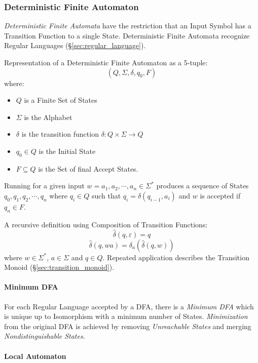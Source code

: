 \subsubsection{Deterministic Finite Automaton}\label{sec:dfa}

\emph{Deterministic Finite Automata} have the restriction that an
Input Symbol has a Transition Function to a single State.
Deterministic Finite Automata recognize Regular Languages
(\S\ref{sec:regular_language}).

Representation of a Deterministic Finite Automaton as a 5-tuple:
\[
  (Q,\Sigma,\delta,q_0,F)
\]
where:
\begin{itemize}
  \item $Q$ is a Finite Set of States
  \item $\Sigma$ is the Alphabet
  \item $\delta$ is the transition function $\delta: Q \times
    \Sigma \rightarrow Q$
  \item $q_0 \in Q$ is the Initial State
  \item $F \subseteq Q$ is the Set of final Accept States.
\end{itemize}

Running for a given input $w = a_1,a_2, \cdots , a_n \in \Sigma^*$
produces a sequence of States $q_0,q_1,q_2,\cdots , q_n$ where $q_i
\in Q$ such that $q_i = \delta (q_{i-1},a_i)$ and $w$ is accepted if
$q_n \in F$.

A recursive definition using Composition of Transition Functions:
\[
  \widehat{\delta}(q,\varepsilon) = q
\]\[
  \widehat{\delta}(q,wa) = \delta_a(\widehat{\delta}(q,w))
\]
where $w \in \Sigma^*$, $a \in \Sigma$ and $q \in Q$. Repeated
application describes the Transition Monoid
(\S\ref{sec:transition_monoid}).



\paragraph{Minimum DFA}\label{sec:minimum_dfa}\hfill

For each Regular Language accepted by a DFA, there is a \emph{Minimum
  DFA} which is unique up to Isomorphism with a minimum number of
States. \emph{Minimization} from the original DFA is achieved by
removing \emph{Unreachable States} and merging
\emph{Nondistinguishable States}.



\paragraph{Local Automaton}\label{sec:local_automaton}\hfill

